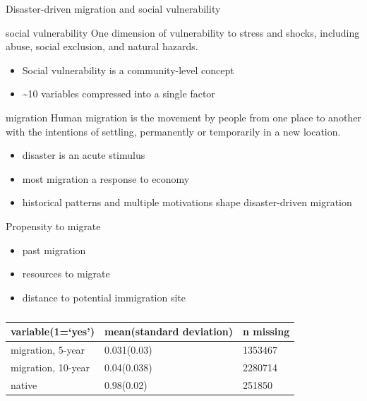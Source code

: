 \documentclass{beamer}
\begin{document}
\begin{frame}{Disaster-driven migration and social vulnerability}
  \begin{definition}{social vulnerability}
    One dimension of vulnerability to stress and shocks, including abuse, social exclusion, and natural hazards.
  \end{definition}
  \begin{itemize}
  \item Social vulnerability is a community-level concept
  \item \textasciitilde 10 variables compressed into a single factor
  \end{itemize}
  \begin{definition}{migration}
    Human migration is the movement by people from one place to another with the intentions of settling, permanently or temporarily in a new location.
  \end{definition}
  \begin{itemize}
  \item disaster is an acute stimulus
  \item most migration a response to economy
  \item historical patterns and multiple motivations shape disaster-driven migration
  \end{itemize}
\end{frame}


\begin{frame}{Propensity to migrate}
  \begin{itemize}
  \item past migration
  \item resources to migrate
  \item distance to potential immigration site
  \end{itemize}
  \begin{table}

  \begin{tabular}{l l l}
    \hline
    variable(1=`yes')  & mean(standard deviation) & n missing \\
    \hline
    migration, 5-year  & 0.031(0.03) & 1353467 \\
    migration, 10-year & 0.04(0.038) & 2280714 \\
    native             & 0.98(0.02) & 251850 \\
    \hline
   \end{tabular}

  \caption{\cite{ipumsi}}
  \end{table}

\end{frame}
\end{document}
